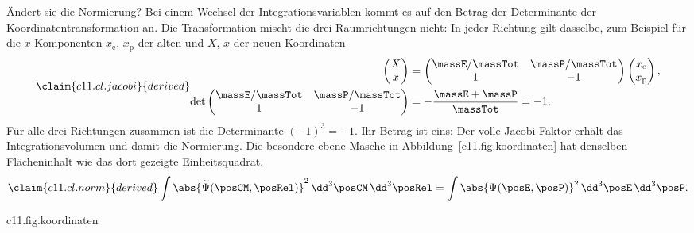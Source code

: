 Ändert sie die Normierung? Bei einem Wechsel der Integrationsvariablen kommt es auf den
Betrag der Determinante der Koordinatentransformation an. Die Transformation mischt die
drei Raumrichtungen nicht: In jeder Richtung gilt dasselbe, zum Beispiel für die
$x$-Komponenten $x_{\mathrm{e}}$, $x_{\mathrm{p}}$ der alten und $X$, $x$ der neuen
Koordinaten
\begin{equation}\label{c11.eq.jacobi}\claim{c11.cl.jacobi}{derived}
  \begin{aligned}
    \begin{pmatrix} X \\ x \end{pmatrix}
    &= \begin{pmatrix} \massE/\massTot & \massP/\massTot \\ 1 & -1 \end{pmatrix}
      \begin{pmatrix} x_{\mathrm{e}} \\ x_{\mathrm{p}} \end{pmatrix}, \\
    \det \begin{pmatrix} \massE/\massTot & \massP/\massTot \\ 1 & -1 \end{pmatrix}
    &= -\frac{\massE + \massP}{\massTot} = -1.
  \end{aligned}
\end{equation}
Für alle drei Richtungen zusammen ist die Determinante $(-1)^3 = -1$. Ihr Betrag ist
eins: Der volle Jacobi-Faktor erhält das Integrationsvolumen und damit die Normierung.
Die besondere ebene Masche in Abbildung~\ref{c11.fig.koordinaten} hat denselben
Flächeninhalt wie das dort gezeigte Einheitsquadrat.
\begin{equation}\label{c11.eq.norm}\claim{c11.cl.norm}{derived}
  \int \abs{\widetilde{\Psi}(\posCM, \posRel)}^2 \,\dd^3\posCM\,\dd^3\posRel
  = \int \abs{\Psi(\posE, \posP)}^2 \,\dd^3\posE\,\dd^3\posP .
\end{equation}

\begin{tpcfigure}{c11.fig.koordinaten}
  \caption{Der Koordinatenwechsel für eine Raumrichtung, wieder für
    $\massP : \massE = 3 : 1$ gezeichnet. Durchgezogene Linien: $X$ fest; gestrichelte
    Linien: $x$ fest. Die neuen Koordinatenlinien stehen nicht senkrecht aufeinander,
    aber die Masche zwischen $X = 1$, $X = 2$, $x = 0$ und $x = 1$ hat denselben
    Flächeninhalt wie das Einheitsquadrat der alten Koordinaten: Der Betrag der
    Determinante in \eqref{c11.eq.jacobi} ist eins.}
\end{tpcfigure}

